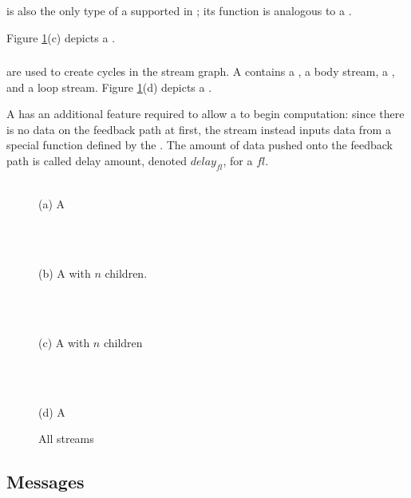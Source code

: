 {\roundrobin} is also the only type of a {\joiner} supported in
{\StreamIt}; its function is analogous to a {\roundrobin} {\splitter}.

Figure \ref{fig:structure}(c) depicts a
{\splitjoin}.

\subsubsection{\feedbackloops}
\label{sec:explain-fl}

{\feedbackloops} are used to create cycles in the stream graph. A
{\feedbackloop} contains a {\joiner}, a body stream, a {\splitter}, and
a loop stream.  Figure \ref{fig:structure}(d) depicts a
{\feedbackloop}.

A {\feedbackloop} has an additional feature required to allow a
{\feedbackloop} to begin computation: since there is no data on
the feedback path at first, the stream instead inputs data from a
special function defined by the {\feedbackloop}.  The amount of
data pushed onto the feedback path is called delay amount, denoted
$delay_{fl}$, for a {\feedbackloop} $fl$.

\begin{figure}\begin{center}
\begin{minipage}{2in}
\centering
{} \\
{\protect\small (a) A {\filter}}
\end{minipage}
~
\begin{minipage}{2in}
\centering
{} \\
{\protect\small (b) A {\pipeline} with $n$ children.}
\end{minipage}
~
\begin{minipage}{2in}
\centering
{} \\
{\protect\small (c) A {\splitjoin} with $n$ children}
\end{minipage}
~
\begin{minipage}{2in}
\centering
{} \\
{\protect\small (d) A {\feedbackloop}}
\end{minipage}
\end{center}
\caption{All {\StreamIt} streams}
\label{fig:structure}
\end{figure}

\subsection{Messages}
\label{sec:streamit:messages}

